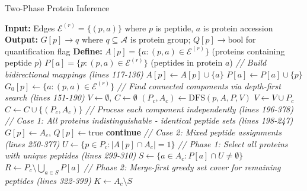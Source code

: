 \documentclass{article}
\begin{document}
\begin{algorithm}[H]
\caption{Two-Phase Protein Inference}
\begin{algorithmic}[1]
\State \textbf{Input:} Edges $\mathcal{E}^{(r)} = \{(p, a)\}$ where $p$ is peptide, $a$ is protein accession
\State \textbf{Output:} $G[p] \to q$ where $q \subseteq \mathcal{A}$ is protein group; $Q[p] \to \text{bool}$ for quantification flag
\State \textbf{Define:} $A[p] = \{a : (p, a) \in \mathcal{E}^{(r)}\}$ (proteins containing peptide $p$)
\State \hspace{2.3em} $P[a] = \{p : (p, a) \in \mathcal{E}^{(r)}\}$ (peptides in protein $a$)
\State
\State \textit{// Build bidirectional mappings (lines 117-136)}
    \State $A[p] \gets A[p] \cup \{a\}$ 
    \State $P[a] \gets P[a] \cup \{p\}$ 
    \State $G_0[p] \gets \{a : (p, a) \in \mathcal{E}^{(r)}\}$ 
\EndFor
\State
\State \textit{// Find connected components via depth-first search (lines 151-190)}
\State $V \gets \emptyset$, $C \gets \emptyset$ 
        \State $(P_c, A_c) \gets \text{DFS}(p, A, P, V)$ 
        \State $V \gets V \cup P_c$ 
        \State $C \gets C \cup \{(P_c, A_c)\}$
    \EndIf
\EndFor
\State
\State \textit{// Process each component independently (lines 196-378)}
    \State
    \State \textit{// Case 1: All proteins indistinguishable - identical peptide sets (lines 198-247)}
            \State $G[p] \gets A_c$, $Q[p] \gets \text{true}$ 
        \EndFor
        \State \textbf{continue}
    \EndIf
    \State
    \State \textit{// Case 2: Mixed peptide assignments (lines 250-377)}
    \State $U \gets \{p \in P_c : |A[p] \cap A_c| = 1\}$ 
    \State
    \State \textit{// Phase 1: Select all proteins with unique peptides (lines 299-310)}
    \State $S \gets \{a \in A_c : P[a] \cap U \neq \emptyset\}$ 
    \State $R \gets P_c \setminus \bigcup_{a \in S} P[a]$ 
    \State
    \State \textit{// Phase 2: Merge-first greedy set cover for remaining peptides (lines 322-399)}
    \State $K \gets A_c \setminus S$ 

\end{algorithmic}
\end{algorithm}
\end{document}
